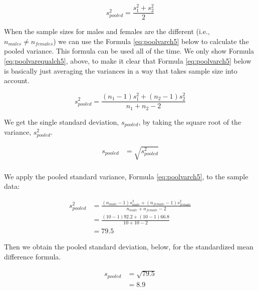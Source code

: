 \documentclass[
]{krantz}
\begin{document}
\begin{equation} 
s_{pooled}^2  = \frac{s_{1}^2 + s_{2}^2}{2} 
      \label{eq:poolvarequalch5}
\end{equation}

When the sample sizes for males and females are the different (i.e., \(n_{males} \ne n_{females}\)) we can use the Formula \eqref{eq:poolvarch5} below to calculate the pooled variance. This formula can be used all of the time. We only show Formula \eqref{eq:poolvarequalch5}, above, to make it clear that Formula \eqref{eq:poolvarch5} below is basically just averaging the variances in a way that takes sample size into account.

\begin{equation} 
s_{pooled}^2  = \frac{(n_1 -1)s_1^2 + (n_2 -1)s_2^2}{n_1 + n_2-2}
      \label{eq:poolvarch5}
\end{equation}

We get the single standard deviation, \(s_{pooled}\), by taking the square root of the variance, \(s_{pooled}^2\).

\[
\begin{aligned} 
s_{pooled}  &= \sqrt{s_{pooled}^2} \\
\end{aligned} 
\]

We apply the pooled standard variance, Formula \eqref{eq:poolvarch5}, to the sample data:

\[
\begin{aligned}
s_{pooled}^2 &= \frac{(n_{male} -1)s_{male}^2 + (n_{female} -1)s_{female}^2}{n_{male} + n_{female}-2} \\
&= \frac{(10 -1)92.2 + (10 -1)66.8}{10 + 10 -2} \\
&= 79.5
\end{aligned}
\]

Then we obtain the pooled standard deviation, below, for the standardized mean difference formula.

\[
\begin{aligned} 
s_{pooled}  &= \sqrt{79.5} \\
&= 8.9\\
\end{aligned} 
\]
\end{document}

